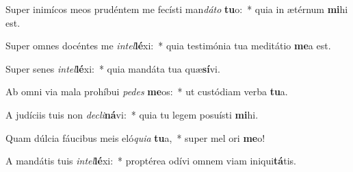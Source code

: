 \item Super inimícos meos prudéntem me fecísti man\textit{dá}\textit{to} \textbf{tu}o:~* quia in ætérnum \textbf{mi}hi est.
\item Super omnes docéntes me \textit{in}\textit{tel}\textbf{lé}xi:~* quia testimónia tua meditátio \textbf{me}a est.
\item Super senes \textit{in}\textit{tel}\textbf{lé}xi:~* quia mandáta tua quæ\textbf{sí}vi.
\item Ab omni via mala prohíbui \textit{pe}\textit{des} \textbf{me}os:~* ut custódiam verba \textbf{tu}a.
\item A judíciis tuis non \textit{de}\textit{cli}\textbf{ná}vi:~* quia tu legem posuísti \textbf{mi}hi.
\item Quam dúlcia fáucibus meis eló\textit{qui}\textit{a} \textbf{tu}a,~* super mel ori \textbf{me}o!
\item A mandátis tuis \textit{in}\textit{tel}\textbf{lé}xi:~* proptérea odívi omnem viam iniqui\textbf{tá}tis.
